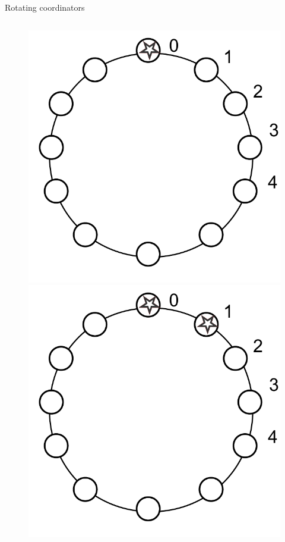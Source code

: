 \begin{frame}{Rotating coordinators}
\begin{columns}
\begin{column}{0.4\textwidth}
\begin{figure}
\begin{overprint}
			\includegraphics[width=\textwidth]{rotating1}
			\onslide<3|handout:0>\includegraphics[width=\textwidth]{rotating2}

\end{overprint}
\end{figure}
\end{column}
\end{columns}
\end{frame}
